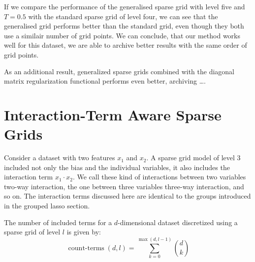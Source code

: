 If we compare the performance of the generalised sparse grid with level five and
\(T = 0.5\) with the standard sparse grid of level four, we can see that the
generalised grid performs better than the standard grid, even though they both
use a similair number of grid points.
We can conclude, that our method works well for this dataset, we are able to
archive better results with the same order of grid points.

As an additional result, generalized sparse grids combined with the diagonal
matrix regularization functional performs even better, archiving \ldots.

\section{Interaction-Term Aware Sparse Grids}
Consider a dataset with two features \(x_1\) and \(x_2\).
A sparse grid model of level 3 included not only the bias and the individual
variables, it also includes the interaction term \(x_1 \cdot x_2\).
We call these kind of interactions between two variables two-way interaction,
the one between three variables three-way interaction, and so on.
The interaction terms discussed here are identical to the groups introduced in
the grouped lasso section.

The number of included terms for a \(d\)-dimensional dataset
discretized using a sparse grid of level \(l\) is given by:
\begin{equation*}
  \operatorname{count-terms}(d, l) = \sum_{k  = 0}^{\max (d, l-1)} \binom{d}{k} 
\end{equation*}


